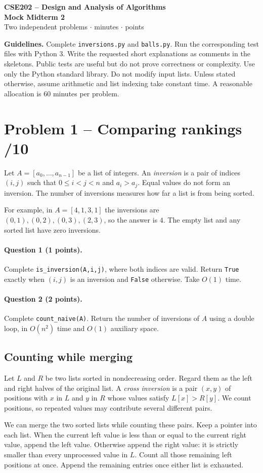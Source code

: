 \documentclass[11pt,a4paper]{article}
\newcommand{\q}[2]{\paragraph{Question #1 (#2 points).}}
\begin{document}
\begin{center}{\large\bfseries CSE202 -- Design and Analysis of Algorithms}\\[4pt]{\LARGE\bfseries Mock Midterm 2}\\[5pt]Two independent problems \quad $\cdot$  minutes \quad $\cdot$  points\end{center}
\textbf{Guidelines.} Complete \texttt{inversions.py} and \texttt{balls.py}. Run the corresponding test files with Python 3. Write the requested short explanations as comments in the skeletons. Public tests are useful but do not prove correctness or complexity. Use only the Python standard library. Do not modify input lists. Unless stated otherwise, assume arithmetic and list indexing take constant time. A reasonable allocation is 60 minutes per problem.
\section*{Problem 1 -- Comparing rankings \hfill /10}
Let $A=[a_0,\ldots,a_{n-1}]$ be a list of integers. An \emph{inversion} is a pair of indices $(i,j)$ such that $0\le i<j<n$ and $a_i>a_j$. Equal values do not form an inversion. The number of inversions measures how far a list is from being sorted.

For example, in $A=[4,1,3,1]$ the inversions are $(0,1),(0,2),(0,3),(2,3)$, so the answer is $4$. The empty list and any sorted list have zero inversions.
\q{1}{1} Complete \texttt{is\_inversion(A,i,j)}, where both indices are valid. Return \texttt{True} exactly when $(i,j)$ is an inversion and \texttt{False} otherwise. Take $O(1)$ time.
\q{2}{2} Complete \texttt{count\_naive(A)}. Return the number of inversions of $A$ using a double loop, in $O(n^2)$ time and $O(1)$ auxiliary space.
\newpage
\subsection*{Counting while merging}
Let $L$ and $R$ be two lists sorted in nondecreasing order. Regard them as the left and right halves of the original list. A \emph{cross inversion} is a pair $(x,y)$ of positions with $x$ in $L$ and $y$ in $R$ whose values satisfy $L[x]>R[y]$. We count positions, so repeated values may contribute several different pairs.

We can merge the two sorted lists while counting these pairs. Keep a pointer into each list. When the current left value is less than or equal to the current right value, append the left value. Otherwise append the right value: it is strictly smaller than every unprocessed value in $L$. Count all those remaining left positions at once. Append the remaining entries once either list is exhausted.
\end{document}
